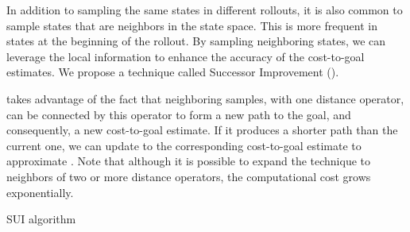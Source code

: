 In addition to sampling the same states in different rollouts, it is also common to sample states that are neighbors in the state space. This is more frequent in states at the beginning of the rollout. By sampling neighboring states, we can leverage the local information to enhance the accuracy of the cost-to-goal estimates. We propose a technique called Successor Improvement (\hvfc).

\hvfc takes advantage of the fact that neighboring samples, with one distance operator, can be connected by this operator to form a new path to the goal, and consequently, a new cost-to-goal estimate. If it produces a shorter path than the current one, we can update to the corresponding cost-to-goal estimate to approximate \hstar. Note that although it is possible to expand the technique to neighbors of two or more distance operators, the computational cost grows exponentially.

\begin{algorithm}[ht]
    \SetAlgoLined




    \caption{SUI algorithm}
    \label{alg:sui}
\end{algorithm}

